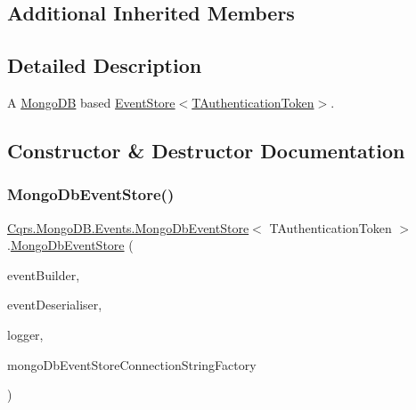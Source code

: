 \subsection*{Additional Inherited Members}


\subsection{Detailed Description}
A \hyperlink{namespaceCqrs_1_1MongoDB}{Mongo\+DB} based \hyperlink{classCqrs_1_1Events_1_1EventStore_a6346cb2aea4c5b4e740dc6cfb15abab8_a6346cb2aea4c5b4e740dc6cfb15abab8}{Event\+Store$<$\+T\+Authentication\+Token$>$}. 



\subsection{Constructor \& Destructor Documentation}
\mbox{\label{classCqrs_1_1MongoDB_1_1Events_1_1MongoDbEventStore_aba191a256900183f880d1f083b384b26_aba191a256900183f880d1f083b384b26}} 
\subsubsection{\texorpdfstring{Mongo\+Db\+Event\+Store()}{MongoDbEventStore()}}
{\footnotesize\ttfamily \hyperlink{classCqrs_1_1MongoDB_1_1Events_1_1MongoDbEventStore}{Cqrs.\+Mongo\+D\+B.\+Events.\+Mongo\+Db\+Event\+Store}$<$ T\+Authentication\+Token $>$.\hyperlink{classCqrs_1_1MongoDB_1_1Events_1_1MongoDbEventStore}{Mongo\+Db\+Event\+Store} (\begin{DoxyParamCaption}\item[{\hyperlink{interfaceCqrs_1_1Events_1_1IEventBuilder}{I\+Event\+Builder}$<$ T\+Authentication\+Token $>$}]{event\+Builder,  }\item[{\hyperlink{interfaceCqrs_1_1Events_1_1IEventDeserialiser}{I\+Event\+Deserialiser}$<$ T\+Authentication\+Token $>$}]{event\+Deserialiser,  }\item[{I\+Logger}]{logger,  }\item[{\hyperlink{interfaceCqrs_1_1MongoDB_1_1Events_1_1IMongoDbEventStoreConnectionStringFactory}{I\+Mongo\+Db\+Event\+Store\+Connection\+String\+Factory}}]{mongo\+Db\+Event\+Store\+Connection\+String\+Factory }\end{DoxyParamCaption})}



